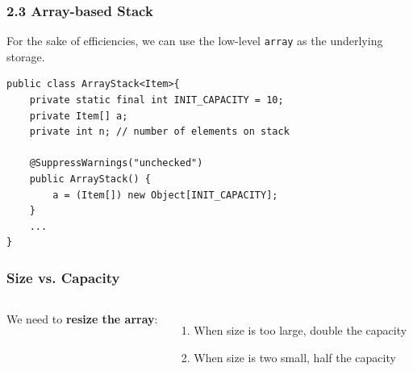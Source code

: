 \documentclass[aspectratio=169, 14pt]{beamer}
\begin{document}
\begin{frame}[fragile]
    \frametitle{2.3 Array-based Stack}
For the sake of efficiencies, we can use the low-level \texttt{array} as the underlying storage.

\begin{verbatim}
public class ArrayStack<Item>{
    private static final int INIT_CAPACITY = 10;
    private Item[] a;
    private int n; // number of elements on stack

    @SuppressWarnings("unchecked")
    public ArrayStack() {
        a = (Item[]) new Object[INIT_CAPACITY];
    }
    ...
}
\end{verbatim}

\end{frame}

\begin{frame}[fragile]
    \frametitle{Size vs. Capacity}

    \begin{columns}

        We need to \textbf{resize the array}:

        \begin{enumerate}
            \item When size is too large, double the capacity
            \item When size is two small, half the capacity
        \end{enumerate}        
    \end{columns}

\end{frame}
\end{document}
